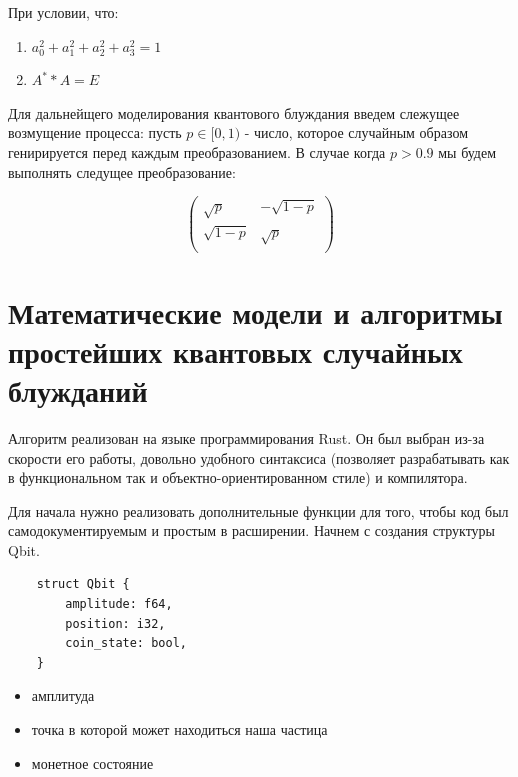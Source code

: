\documentclass[a4paper]{report}
\begin{document}
При условии, что:

\begin{enumerate}
  \item $a_{0}^{2} + a_{1}^{2} + a_{2}^{2} + a_{3}^{2} = 1$
  \item $A^{*} * A = E$
\end{enumerate}

Для дальнейщего моделирования квантового блуждания введем слежущее возмущение процесса: пусть $p \in [0, 1)$ - число, которое случайным образом генирируется перед каждым преобразованием. В случае когда $p > 0.9$ мы будем выполнять следущее преобразование:

\begin{equation} \label{disturbance_transformation}
   \left(
      \begin{array}{cc}
       \sqrt{p} & -\sqrt{1 - p} \\
       \sqrt{1 - p} & \sqrt{p} \\
      \end{array}
    \right)
\end{equation}


\section{Математические модели и алгоритмы простейших квантовых случайных блужданий}

Алгоритм реализован на языке программирования Rust. Он был выбран из-за скорости его работы, довольно удобного синтаксиса (позволяет разрабатывать как в функциональном так и объектно-ориентированном стиле) и компилятора.

Для начала нужно реализовать дополнительные функции для того, чтобы код был самодокументируемым и простым в расширении.
Начнем с создания структуры Qbit.
\begin{lstlisting}
    struct Qbit {
        amplitude: f64,
        position: i32,
        coin_state: bool,
    }
\end{lstlisting}

\begin{itemize}
  \item амплитуда
  \item точка в которой может находиться наша частица
  \item монетное состояние
\end{itemize}
\end{document}
